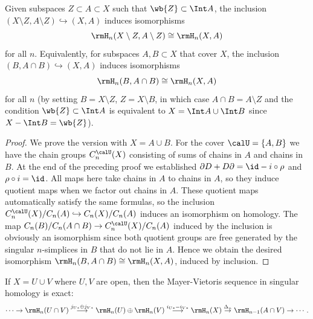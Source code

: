 \begin{thm}\label{thm excision homology}
    Given subspaces $Z\subset A\subset X$ such that $\wb{Z}\subset \Int A$, the inclusion $(X\setminus Z,A\setminus Z)\hookrightarrow (X,A)$ induces isomorphisms 
    \[\rmH_n(X\setminus Z,A\setminus Z)\cong \rmH_n(X,A)\]
    for all $n$. Equivalently, for subspaces $A,B\subset X$ that cover $X$, the inclusion $(B,A\cap B)\hookrightarrow (X,A)$ induces isomorphisms
    \[\rmH_n(B,A\cap B)\cong \rmH_n(X,A)\]
    for all $n$ (by setting $B=X\setminus Z$, $Z=X\setminus B$, in which case $A\cap B=A\setminus Z$ and the condition $\wb{Z}\subset \Int A$ is equivalent to $X=\Int A\cup\Int B$ since $X-\Int B=\wb{Z}$).
\end{thm}
\begin{proof}
     We prove the version with $X=A\cup B$. For the cover $\calU=\{A,B\}$ we have the chain groups $C_n^\calU(X)$ consisting of sums of chains in $A$ and chains in $B$. At the end of the preceding proof we established $\partial D+D\partial=\id-i\circ\rho$ and $\rho\circ i=\id$. All maps here take chains in $A$ to chains in $A$, so they induce  quotient maps when we factor out chains in $A$. These quotient maps automatically satisfy the same formulas, so the inclusion $C^\calU_n(X)/C_n(A)\hookrightarrow C_n(X)/C_n(A)$ induces an isomorphism on homology. The map $C_n(B)/C_n(A\cap B)\to C_n^\calU(X)/C_n(A)$ induced by the inclusion is obviously an isomorphism since both quotient groups are free generated by the singular $n$-simplices in $B$ that do not lie in $A$. Hence we obtain the desired isomorphism $\rmH_n(B,A\cap B)\cong \rmH_n(X,A)$, induced by inclusion.
\end{proof}
\begin{cor}\label{cor MV sequence in singular homology}
    If $X=U\cup V$ where $U,V$ are open, then the Mayer-Vietoris sequence in singular homology is exact:
    \[\cdots \to \rmH_n(U\cap V)\overset{j_{U\ast}\oplus j_{V\ast}}{\longrightarrow} \rmH_n(U)\oplus \rmH_n(V)\overset{i_{U\ast}-i_{V\ast}}{\longrightarrow} \rmH_n(X)\overset{\Delta_n}{\to} \rmH_{n-1}(A\cap V)\to \cdots .\]
\end{cor}
